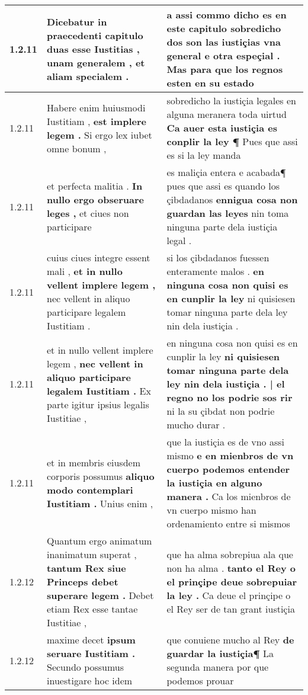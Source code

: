 \begin{tabular}{|p{1cm}|p{6.5cm}|p{6.5cm}|}
1.2.11 & Dicebatur in praecedenti capitulo \textbf{ duas esse Iustitias , } unam generalem , et aliam specialem . & a assi commo dicho es en este capitulo \textbf{ sobredicho dos son las iustiçias vna general e otra espeçial . } Mas para que los regnos esten en su estado \\\hline
1.2.11 & Habere enim huiusmodi Iustitiam , \textbf{ est implere legem . } Si ergo lex iubet omne bonum , & sobredicho la iustiçia legales en alguna meranera toda uirtud \textbf{ Ca auer esta iustiçia es conplir la ley ¶ } Pues que assi es si la ley manda \\\hline
1.2.11 & et perfecta malitia . \textbf{ In nullo ergo obseruare leges , } et ciues non participare & es maliçia entera e acabada¶ pues que assi es quando los çibdadanos \textbf{ ennigua cosa non guardan las leyes } nin toma ninguna parte dela iustiçia legal . \\\hline
1.2.11 & cuius ciues integre essent mali , \textbf{ et in nullo vellent implere legem , } nec vellent in aliquo participare legalem Iustitiam . & si los çibdadanos fuessen enteramente malos . \textbf{ en ninguna cosa non quisi es en cunplir la ley } ni quisiesen tomar ninguna parte dela ley nin dela iustiçia . \\\hline
1.2.11 & et in nullo vellent implere legem , \textbf{ nec vellent in aliquo participare legalem Iustitiam . } Ex parte igitur ipsius legalis Iustitiae , & en ninguna cosa non quisi es en cunplir la ley \textbf{ ni quisiesen tomar ninguna parte dela ley nin dela iustiçia . | el regno no los podrie sos rir } ni la su çibdat non podrie mucho durar . \\\hline
1.2.11 & et in membris eiusdem corporis possumus \textbf{ aliquo modo contemplari Iustitiam . } Unius enim , & que la iustiçia es de vno assi mismo \textbf{ e en mienbros de vn cuerpo podemos entender la iustiçia en alguno manera . } Ca los mienbros de vn cuerpo mismo han ordenamiento entre si mismos \\\hline
1.2.12 & Quantum ergo animatum inanimatum superat , \textbf{ tantum Rex siue Princeps debet superare legem . } Debet etiam Rex esse tantae Iustitiae , & que ha alma sobrepiua ala que non ha alma . \textbf{ tanto el Rey o el prinçipe deue sobrepuiar la ley . } Ca deue el prinçipe o el Rey ser de tan grant iustiçia \\\hline
1.2.12 & maxime decet \textbf{ ipsum seruare Iustitiam . } Secundo possumus inuestigare hoc idem & que conuiene mucho al Rey \textbf{ de guardar la iustiçia¶ } La segunda manera por que podemos prouar \\\hline

\end{tabular}
